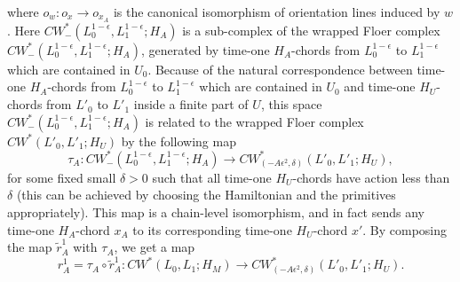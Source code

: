 \documentclass{amsart}
\numberwithin{equation}{section}
\numberwithin{figure}{section}
\begin{document}
where $o_{w}: o_{x} \to o_{x_{A}}$ is the canonical isomorphism of orientation lines induced by $w$. Here $CW^{*}_{-}(L_{0}^{1-\epsilon}, L_{1}^{1-\epsilon}; H_{A})$ is a sub-complex of the wrapped Floer complex $CW^{*}_{-}(L_{0}^{1-\epsilon}, L_{1}^{1-\epsilon}; H_{A})$, generated by time-one $H_{A}$-chords from $L_{0}^{1-\epsilon}$ to $L_{1}^{1-\epsilon}$ which are contained in $U_{0}$. Because of the natural correspondence between time-one $H_{A}$-chords from $L_{0}^{1-\epsilon}$ to $L_{1}^{1-\epsilon}$ which are contained in $U_{0}$ and time-one $H_{U}$-chords from $L'_{0}$ to $L'_{1}$ inside a finite part of $U$, this space $CW^{*}_{-}(L_{0}^{1-\epsilon}, L_{1}^{1-\epsilon}; H_{A})$ is related to the wrapped Floer complex $CW^{*}(L'_{0}, L'_{1}; H_{U})$ by the following map
\begin{equation}
\tau_{A}: CW^{*}_{-}(L_{0}^{1-\epsilon}, L_{1}^{1-\epsilon}; H_{A}) \to CW^{*}_{(-A\epsilon^{2}, \delta)}(L'_{0}, L'_{1}; H_{U}),
\end{equation}
for some fixed small $\delta > 0$ such that all time-one $H_{U}$-chords have action less than $\delta$ (this can be achieved by choosing the Hamiltonian and the primitives appropriately). This map is a chain-level isomorphism, and in fact sends any time-one $H_{A}$-chord $x_{A}$ to its corresponding time-one $H_{U}$-chord $x'$.
By composing the map $\tilde{r}^{1}_{A}$ with $\tau_{A}$, we get a map
\begin{equation}
r^{1}_{A} = \tau_{A} \circ \tilde{r}^{1}_{A}: CW^{*}(L_{0}, L_{1}; H_{M}) \to CW^{*}_{(-A\epsilon^{2}, \delta)}(L'_{0}, L'_{1}; H_{U}).
\end{equation} \par
\end{document}
